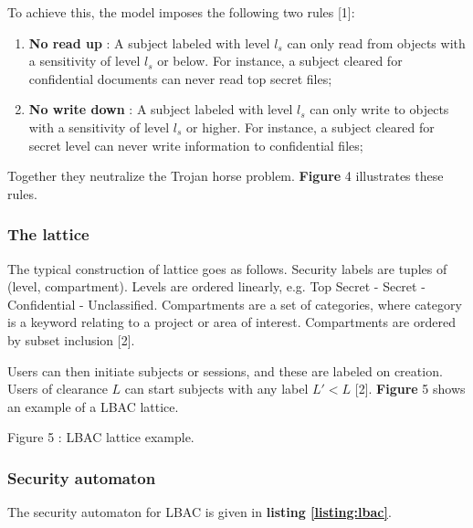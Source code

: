 To achieve this, the model imposes the following two rules [1]:
\begin{enumerate}
	\item \textbf{No read up} : A subject labeled with level $l_{s}$ can only read from objects with a sensitivity of level $l_{s}$ or below. For instance, a subject cleared for confidential documents can never read top secret files;
	\item \textbf{No write down} : A subject labeled with level $l_{s}$ can only write to objects with a sensitivity of level $l_{s}$ or higher. For instance, a subject cleared for secret level can never write information to confidential files;
\end{enumerate}

Together they neutralize the Trojan horse problem. \textbf{Figure} 4 illustrates these rules.


\subsubsection{The lattice}

The typical construction of lattice goes as follows. Security labels are tuples of (level, compartment). Levels are ordered linearly, e.g. Top Secret - Secret - Confidential - Unclassified. Compartments are a set of categories, where category is a keyword relating to a project or area of interest. Compartments are ordered by subset inclusion [2].

Users can then initiate subjects or sessions, and these are labeled on creation. Users of clearance $L$ can start subjects with any label $L' < L$ [2]. \textbf{Figure} 5 shows an example of a LBAC lattice.

Figure 5 : LBAC lattice example.


\subsubsection{Security automaton}

The security automaton for LBAC is given in \textbf{listing \ref{listing:lbac}}.

